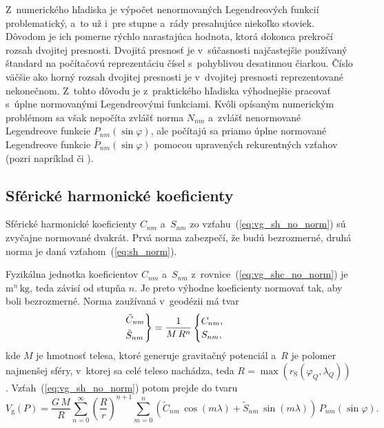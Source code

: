 \documentclass[a4paper,12pt]{book}
\newcommand{\gidx}{\mathrm g}
\begin{document}
Z~numerického hľadiska je výpočet nenormovaných Legendreových funkcií 
problematický, a~to už i~pre stupne a~rády presahujúce niekoľko stoviek.  
Dôvodom je ich pomerne rýchlo narastajúca hodnota, ktorá dokonca prekročí 
rozsah dvojitej presnosti.  Dvojitá presnosť je v~súčasnosti najčastejšie 
používaný štandard na počítačovú reprezentáciu čísel s~pohyblivou desatinnou 
čiarkou.  Číslo väčšie ako horný rozsah dvojitej presnosti je v~dvojitej 
presnosti reprezentované nekonečnom.  Z~tohto dôvodu je z~praktického hľadiska 
výhodnejšie pracovať s~úplne normovanými Legendreovými funkciami.  Kvôli 
opísaným numerickým problémom sa však nepočíta zvlášť norma $N_{nm}$ a~zvlášť 
nenormované Legendreove funkcie $P_{nm}(\sin\varphi)$, ale počítajú sa priamo 
úplne normované Legendreove funkcie $\bar{P}_{nm}(\sin\varphi)$ pomocou 
upravených rekurentných vzťahov (pozri napríklad \cite{Holmes2002a} či 
\cite{Fukushima2012a}).



\subsection{Sférické harmonické koeficienty}
\label{sec:shc_norm}

Sférické harmonické koeficienty $C_{nm}$ a~$S_{nm}$ zo
vzťahu~(\ref{eq:vg_sh_no_norm}) sú zvyčajne normované dvakrát.  Prvá norma
zabezpečí, že budú bezrozmerné, druhá norma je daná vzťahom~(\ref{eq:sh_norm}).

Fyzikálna jednotka koeficientov $C_{nm}$ a~$S_{nm}$
z~rovnice~(\ref{eq:vg_shc_no_norm}) je $\mathrm{m}^n \, \mathrm{kg}$, teda
závisí od stupňa $n$.  Je preto výhodne koeficienty normovať tak, aby boli
bezrozmerné.  Norma zaužívaná v~geodézii má tvar
%
\begin{equation}
\begin{rcases}
\tilde{C}_{nm}\\
\tilde{S}_{nm}
\end{rcases}
= \frac{1}{M \, R^n}
\begin{cases}
C_{nm}{,}\\
S_{nm}{,}
\end{cases}
\end{equation}
%
kde $M$ je hmotnosť telesa, ktoré generuje gravitačný potenciál a~$R$ je
polomer najmenšej sféry, v~ktorej sa celé teleso nachádza, teda $R
= \max(r_\mathrm{S}(\varphi_Q, \lambda_Q))$.  Vzťah~(\ref{eq:vg_sh_no_norm})
potom prejde do tvaru
%
\begin{equation}
\label{eq:vg_sh_1st_norm}
V_\gidx(P) = \frac{G \, M}{R} \sum_{n = 0}^\infty \left( \frac{R}{r} \right)^{n
+ 1} \sum_{m = 0}^{n} \left( \tilde{C}_{nm} \, \cos(m\lambda) + \tilde{S}_{nm}
\, \sin(m\lambda)\right) \, P_{nm}(\sin\varphi){.}
\end{equation}
\end{document}
